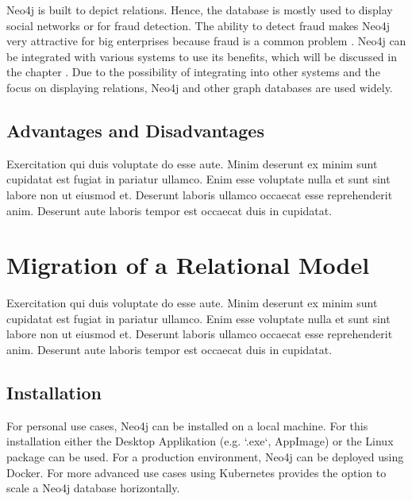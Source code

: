 Neo4j is built to depict relations. Hence, the database is mostly used to display social networks or for fraud detection. The ability to detect fraud makes Neo4j very attractive for big enterprises because fraud is a common problem \parencite{Neo4jfeatures}. Neo4j can be integrated with various systems to use its benefits, which will be discussed in the chapter . Due to the possibility of integrating into other systems and the focus on displaying relations, Neo4j and other graph databases 
are used widely.

\subsection{Advantages and Disadvantages} \label{subsec:advantagesDisadvantagesNeo4j}

Exercitation qui duis voluptate do esse aute. Minim deserunt ex minim sunt cupidatat est fugiat in pariatur ullamco. Enim esse voluptate nulla et sunt sint labore non ut eiusmod et. Deserunt laboris ullamco occaecat esse reprehenderit anim. Deserunt aute laboris tempor est occaecat duis in cupidatat.


\section{Migration of a Relational Model} \label{sec:migrationRelationModelneo4j}

Exercitation qui duis voluptate do esse aute. Minim deserunt ex minim sunt cupidatat est fugiat in pariatur ullamco. Enim esse voluptate nulla et sunt sint labore non ut eiusmod et. Deserunt laboris ullamco occaecat esse reprehenderit anim. Deserunt aute laboris tempor est occaecat duis in cupidatat.

\subsection{Installation} \label{subsec:installationNeo4j}

For personal use cases, Neo4j can be installed on a local machine. For this installation either the Desktop Applikation (e.g. `.exe`, AppImage) or the Linux package can be used. For a production environment, Neo4j can be deployed using Docker. For more advanced use cases using Kubernetes provides the option to scale a Neo4j database horizontally.

